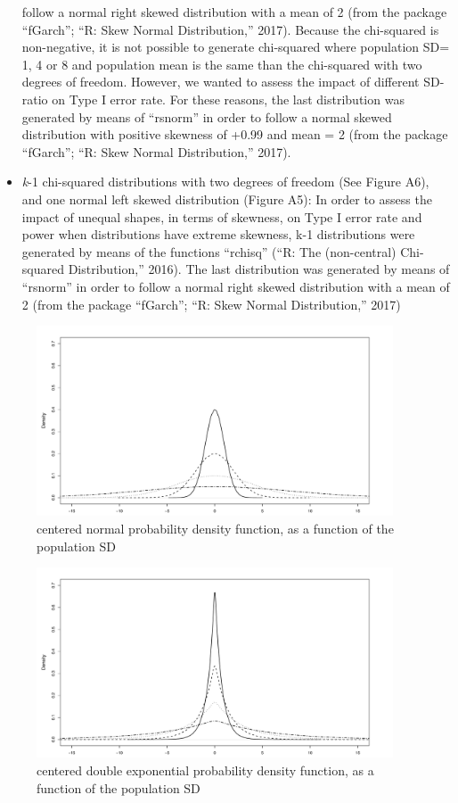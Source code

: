 \documentclass[man,floatsintext]{apa6}
\begin{document}
\begin{appendix}
\begin{itemize}
follow a normal right skewed distribution with a mean of 2 (from the
package ``fGarch''; ``R: Skew Normal Distribution,'' 2017). Because
the chi-squared is non-negative, it is not possible to generate
chi-squared where population SD= 1, 4 or 8 and population mean is the
same than the chi-squared with two degrees of freedom. However, we
wanted to assess the impact of different SD-ratio on Type I error
rate. For these reasons, the last distribution was generated by means
of ``rsnorm'' in order to follow a normal skewed distribution with
positive skewness of +0.99 and mean = 2 (from the package ``fGarch'';
``R: Skew Normal Distribution,'' 2017).
\item
\emph{k}-1 chi-squared distributions with two degrees of freedom (See
Figure A6), and one normal left skewed distribution (Figure A5): In
order to assess the impact of unequal shapes, in terms of skewness, on
Type I error rate and power when distributions have extreme skewness,
k-1 distributions were generated by means of the functions ``rchisq''
(``R: The (non-central) Chi-squared Distribution,'' 2016). The last
distribution was generated by means of ``rsnorm'' in order to follow a
normal right skewed distribution with a mean of 2 (from the package
``fGarch''; ``R: Skew Normal Distribution,'' 2017)
\end{itemize}

\begin{figure}
\includegraphics[width=400px]{W-test_files/figure-latex/unnamed-chunk-17-1} \caption{centered normal probability density function, as a function of the population SD}\label{fig:unnamed-chunk-17}
\end{figure}

\begin{figure}
\includegraphics[width=400px]{W-test_files/figure-latex/unnamed-chunk-18-1} \caption{centered double exponential probability density function, as a function of the population SD}\label{fig:unnamed-chunk-18}
\end{figure}


\end{appendix}
\end{document}
